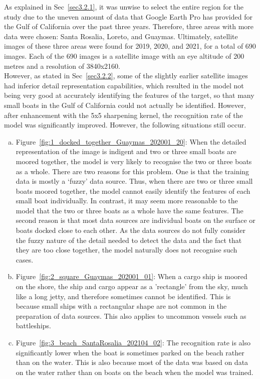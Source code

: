 As explained in Sec~\ref{sec3.2.1}, it was unwise to select the entire region for the study due to the uneven amount of data that Google Earth Pro has provided for the Gulf of California over the past three years. Therefore, three areas with more data were chosen: Santa Rosalia, Loreto, and Guaymas. Ultimately, satellite images of these three areas were found for 2019, 2020, and 2021, for a total of 690 images. Each of the 690 images is a satellite image with an eye altitude of 200 metres and a resolution of 3840x2160.\\

However, as stated in Sec~\ref{sec3.2.2}, some of the slightly earlier satellite images had inferior detail representation capabilities, which resulted in the model not being very good at accurately identifying the features of the target, so that many small boats in the Gulf of California could not actually be identified. However, after enhancement with the 5x5 sharpening kernel, the recognition rate of the model was significantly improved. However, the following situations still occur.\\

\begin{enumerate}[(a)]
    \item  Figure~\ref{fig:1_docked_together_Guaymas_202001_20}: When the detailed representation of the image is indigent and two or three small boats are moored together, the model is very likely to recognise the two or three boats as a whole. There are two reasons for this problem. One is that the training data is mostly a `fuzzy' data source. Thus, when there are two or three small boats moored together, the model cannot easily identify the features of each small boat individually. In contrast, it may seem more reasonable to the model that the two or three boats as a whole have the same features. The second reason is that most data sources are individual boats on the surface or boats docked close to each other. As the data sources do not fully consider the fuzzy nature of the detail needed to detect the data and the fact that they are too close together, the model naturally does not recognise such cases.
    
    \item Figure~\ref{fig:2_square_Guaymas_202001_01}: When a cargo ship is moored on the shore, the ship and cargo appear as a 'rectangle' from the sky, much like a long jetty, and therefore sometimes cannot be identified. This is because small ships with a rectangular shape are not common in the preparation of data sources. This also applies to uncommon vessels such as battleships. 

    \item Figure~\ref{fig:3_beach_SantaRosalia_202104_02}: The recognition rate is also significantly lower when the boat is sometimes parked on the beach rather than on the water. This is also because most of the data was based on data on the water rather than on boats on the beach when the model was trained.

\end{enumerate}

